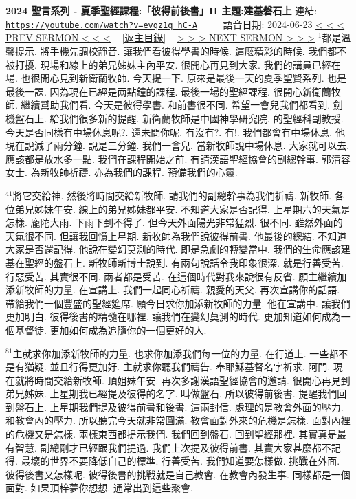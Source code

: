 \documentclass{book}
\begin{document}
\section{}
\label{sec:evqz1q_hC_A}
\textbf{2024 聖言系列 - 夏季聖經課程:「彼得前後書」II 主題:建基磐石上}
\newline
\newline
連結: \href{https://youtube.com/watch?v=evqz1q_hC-A}{\texttt{https://youtube.com/watch?v=evqz1q\_hC-A}} ~~~~ 語音日期: 2024-06-23
\newline
\newline
\hyperref[sec:wAbpGBqNgNM]{\small{< < < PREV SERMON < < <}}
~
\hyperref[sec:index]{\small{[返主目錄]}}
~
\hyperref[sec:BQvEiworls4]{\small{> > > NEXT SERMON > > >}}
\newline
\newline
$^{1}$都是溫馨提示.
將手機先調校靜音.
讓我們看彼得學書的時候.
這麼精彩的時候.
我們都不被打擾.
現場和線上的弟兄姊妹主內平安.
很開心再見到大家.
我們的講員已經在場.
也很開心見到新衛蘭牧師.
今天提一下.
原來是最後一天的夏季聖賢系列.
也是最後一課.
因為現在已經是兩點鐘的課程.
最後一場的聖經課程.
很開心新衛蘭牧師.
繼續幫助我們看.
今天是彼得學書.
和前書很不同.
希望一會兒我們都看到.
劍機盤石上.
給我們很多新的提醒.
新衛蘭牧師是中國神學研究院.
的聖經科副教授.
今天是否同樣有中場休息呢?.
還未問你呢.
有沒有?.
有!.
我們都會有中場休息.
他現在說減了兩分鐘.
說是三分鐘.
我們一會兒.
當新牧師說中場休息.
大家就可以去.
應該都是放水多一點.
我們在課程開始之前.
有請漢語聖經協會的副總幹事.
郭清容女士.
為新牧師祈禱.
亦為我們的課程.
預備我們的心靈.

$^{41}$將它交給神.
然後將時間交給新牧師.
請我們的副總幹事為我們祈禱.
新牧師.
各位弟兄姊妹午安.
線上的弟兄姊妹都平安.
不知道大家是否記得.
上星期六的天氣是怎樣.
龐陀大雨.
下雨下到不得了.
但今天外面陽光非常猛烈.
很不同.
雖然外面的天氣很不同.
但讓我回憶上星期.
新牧師為我們說彼得前書.
他最後的總結.
不知道大家是否還記得.
他說在變幻莫測的時代.
即是急劇的轉變當中.
我們的生命應該建基在聖經的盤石上.
新牧師新博士說到.
有兩句說話令我印象很深.
就是行善受苦.
行惡受苦.
其實很不同.
兩者都是受苦.
在這個時代對我來說很有反省.
願主繼續加添新牧師的力量.
在宣講上.
我們一起同心祈禱.
親愛的天父.
再次宣講你的話語.
帶給我們一個豐盛的聖經筵席.
願今日求你加添新牧師的力量.
他在宣講中.
讓我們更加明白.
彼得後書的精髓在哪裡.
讓我們在變幻莫測的時代.
更加知道如何成為一個基督徒.
更加如何成為追隨你的一個更好的人.

$^{81}$主就求你加添新牧師的力量.
也求你加添我們每一位的力量.
在行道上.
一些都不是有猶疑.
並且行得更加好.
主就求你聽我們禱告.
奉耶穌基督名字祈求.
阿門.
現在就將時間交給新牧師.
頂姐妹午安.
再次多謝漢語聖經協會的邀請.
很開心再見到弟兄姊妹.
上星期我已經提及彼得的名字.
叫做盤石.
所以彼得前後書.
提醒我們回到盤石上.
上星期我們提及彼得前書和後書.
這兩封信.
處理的是教會外面的壓力.
和教會內的壓力.
所以聽完今天就非常圓滿.
教會面對外來的危機是怎樣.
面對內裡的危機又是怎樣.
兩樣東西都提示我們.
我們回到盤石.
回到聖經那裡.
其實真是最有智慧.
副總剛才已經跟我們提過.
我們上次提及彼得前書.
其實大家甚麼都不記得.
最壞的世界不要降低自己的標準.
行善受苦.
我們知道要怎樣做.
挑戰在外面.
彼得後書又怎樣呢.
彼得後書的挑戰就是自己教會.
在教會內發生事.
同樣都是一個面對.
如果頂梓夢你想想.
通常出到這些聚會.
\end{document}
